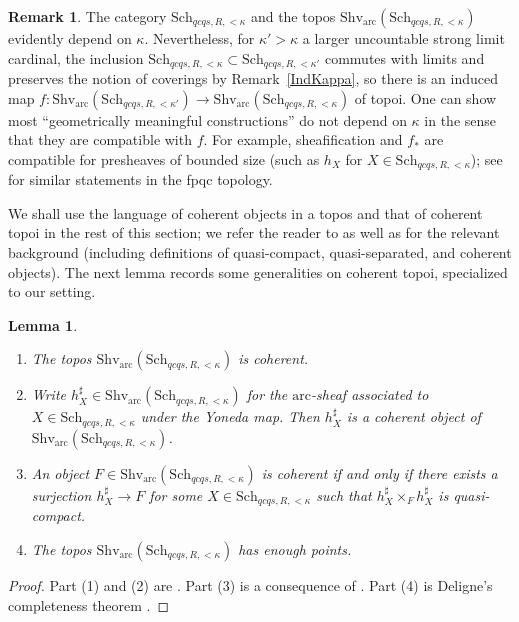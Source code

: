 \documentclass[reqno]{amsart}
\newcommand{\arc}{\mathrm{arc}}
\newtheorem{lemma}[theorem]{Lemma}
\theoremstyle{definition}
\newtheorem{remark}[theorem]{Remark}
\begin{document}
\begin{remark}
The category $\mathrm{Sch}_{qcqs,R, < \kappa}$ and the topos
$\mathrm{Shv}_{\arc}(\mathrm{Sch}_{qcqs,R, < \kappa})$ evidently depend on
$\kappa$. Nevertheless, for $\kappa' > \kappa$ a larger uncountable strong limit
cardinal, the inclusion $\mathrm{Sch}_{qcqs,R, < \kappa} \subset
\mathrm{Sch}_{qcqs,R,< \kappa'}$ commutes with limits and preserves the notion of
coverings by Remark~\ref{IndKappa}, so there is an induced map
$f\colon\mathrm{Shv}_{\arc}(\mathrm{Sch}_{qcqs,R,< \kappa'}) \to
\mathrm{Shv}_{\arc}(\mathrm{Sch}_{qcqs,R, < \kappa})$ of topoi. One can show most
``geometrically meaningful constructions'' do not depend on $\kappa$ in the
sense that they are compatible with $f$. For example,  sheafification and $f_*$
are compatible for presheaves of bounded size (such as $h_X$ for $X \in
\mathrm{Sch}_{qcqs,R, < \kappa}$); see \cite{Waterhouse} for similar statements in the fpqc topology. 
\end{remark}


We shall use the language of coherent objects in a topos and that of coherent
topoi in the rest of this section; we refer the reader to \cite[Expose VI]{SGA4}
as well as \cite[Sec.~A]{SAG} for the relevant background (including definitions of quasi-compact, quasi-separated, and coherent objects). The next lemma records some generalities on coherent topoi, specialized to our setting.

\begin{lemma}
\label{ArcCohTop}
\begin{enumerate}
\item The topos $\mathrm{Shv}_{\arc}(\mathrm{Sch}_{qcqs,R, < \kappa})$ is coherent. 
\item Write  $h_X^\sharp \in \mathrm{Shv}_{\arc}(\mathrm{Sch}_{qcqs,R, <
\kappa})$  for the $\arc$-sheaf associated to $X \in \mathrm{Sch}_{qcqs,R, <
\kappa}$ under the Yoneda map. Then $h_X^\sharp$ is a coherent object of
$\mathrm{Shv}_{\arc}(\mathrm{Sch}_{qcqs,R, < \kappa})$. 
\item  An object $F \in \mathrm{Shv}_{\arc}(\mathrm{Sch}_{qcqs,R, < \kappa})$ is
coherent if and only if there exists a surjection $h_X^\sharp \to F$ for some $X
\in \mathrm{Sch}_{qcqs,R, < \kappa}$ such that $h_X^\sharp \times_F h_X^\sharp$ is quasi-compact.
\item The topos $\mathrm{Shv}_{\arc}(\mathrm{Sch}_{qcqs,R, < \kappa})$ has enough points.
\end{enumerate}
\end{lemma}
\begin{proof}
Part (1) and (2) are \cite[Prop.~A.3.1.3]{SAG}. Part (3) is a consequence of
\cite[Exp.~VI, Cor.~1.17.1]{SGA4}. Part (4) is Deligne's completeness theorem \cite[Expose VI, Appendix]{SGA4}.
\end{proof}
\end{document}
